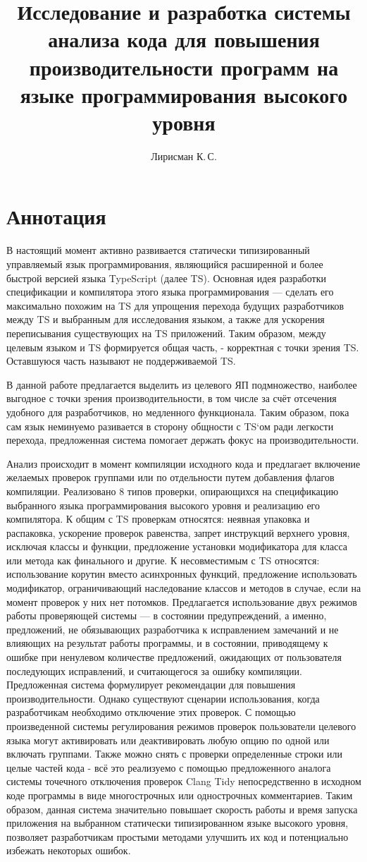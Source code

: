 \documentclass{mipt-thesis-bs}
\title{Исследование и разработка системы анализа кода для повышения производительности программ на языке программирования высокого уровня}
\author{Лирисман К.\,С.}
\begin{document}
\frontmatter
\titlecontents
\chapter{Аннотация}

В настоящий момент активно развивается статически типизированный управляемый язык
программирования, являющийся расширенной и более быстрой версией языка TypeScript (далее TS).
Основная идея разработки спецификации и компилятора этого языка программирования — сделать его максимально
похожим на TS для упрощения перехода будущих разработчиков между TS и
выбранным для исследования языком, а также для ускорения переписывания существующих на TS приложений.
Таким образом, между целевым языком и TS формируется общая часть, - корректная с точки зрения TS.
Оставшуюся часть называют не поддерживаемой TS.

В данной работе предлагается выделить из целевого ЯП подмножество, наиболее выгодное с точки зрения производительности,
в том числе за счёт отсечения удобного для разработчиков, но медленного функционала. Таким образом, пока сам язык неминуемо
разивается в сторону общности с TS`ом ради легкости перехода, предложенная система помогает держать фокус
на производительности.

Анализ происходит в момент компиляции исходного кода и предлагает включение желаемых
проверок группами или по отдельности путем добавления флагов компиляции. Реализовано
8 типов проверки, опирающихся на спецификацию выбранного языка
программирования высокого уровня и реализацию его компилятора. К общим с TS проверкам относятся:
неявная упаковка и распаковка, ускорение проверок равенства, запрет инструкций верхнего уровня, исключая
классы и функции, предложение установки модификатора для класса или метода как
финального и другие. К несовместимым с TS относятся: использование корутин вместо асинхронных функций,
предложение использовать модификатор, ограничивающий наследование классов и методов в случае, если на
момент проверок у них нет потомков.
Предлагается использование двух режимов работы проверяющей системы — в состоянии
предупреждений, а именно, предложений, не обязывающих разработчика к исправлением замечаний и не
влияющих на результат работы программы, и в состоянии, приводящему к ошибке при ненулевом количестве
предложений, ожидающих от пользователя последующих исправлений, и считающегося за
ошибку компиляции.
Предложенная система формулирует рекомендации для повышения производительности. Однако
существуют сценарии использования, когда разработчикам необходимо отключение этих проверок.
С помощью произведенной системы регулирования режимов проверок пользователи целевого языка
могут активировать или деактивировать любую опцию по одной или включать группами.
Также можно снять с проверки определенные строки или целые частей кода - всё это реализуемо с помощью
предложенного аналога системы точечного отключения проверок Clang Tidy непосредственно
в исходном коде программы в виде многострочных или однострочных комментариев.
Таким образом, данная система значительно повышает скорость работы и время запуска
приложения на выбранном статически типизированном языке высокого уровня, позволяет разработчикам
простыми методами улучшить их код и потенциально избежать некоторых ошибок.
\end{document}
